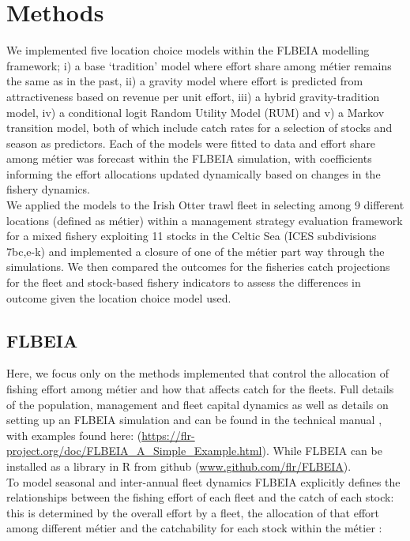 \documentclass[12pt, halfline, a4paper]{ouparticle}
\begin{document}
\section{Methods}
\label{meth}

We implemented five location choice models within the FLBEIA modelling
framework; i) a base `tradition' model where effort share among métier remains
the same as in the past, ii) a gravity model where effort is predicted from
attractiveness based on revenue per unit effort, iii) a hybrid
gravity-tradition model, iv) a conditional logit Random Utility Model (RUM) and
v) a Markov transition model, both of which include catch rates for a selection
of stocks and season as predictors. Each of the models were fitted to data and
effort share among métier was forecast within the FLBEIA simulation, with
coefficients informing the effort allocations updated dynamically based on
changes in the fishery dynamics.  \\

We applied the models to the Irish Otter trawl fleet in selecting among 9
different locations (defined as métier) within a management strategy evaluation
framework for a mixed fishery exploiting 11 stocks in the Celtic Sea (ICES
subdivisions 7bc,e-k) and implemented a closure of one of the métier part way
through the simulations. We then compared the outcomes for the fisheries catch
projections for the fleet and stock-based fishery indicators to assess the
differences in outcome given the location choice model used.

\subsection{FLBEIA}

Here, we focus only on the methods implemented that control the allocation of
fishing effort among métier and how that affects catch for the fleets. Full
details of the population, management and fleet capital dynamics as well as
details on setting up an FLBEIA simulation and can be found in the technical
manual \citep{Garcia2017a}, with examples found here:
(\url{https://flr-project.org/doc/FLBEIA_A_Simple_Example.html}). While FLBEIA
can be installed as a library in R from github
(\url{www.github.com/flr/FLBEIA}).\\ 

To model seasonal and inter-annual fleet dynamics FLBEIA explicitly defines the
relationships between the fishing effort of each fleet and the catch of each
stock: this is determined by the overall effort by a fleet, the allocation of
that effort among different métier and the catchability for each stock within
the métier \citep{Garcia2017a}:
\end{document}
